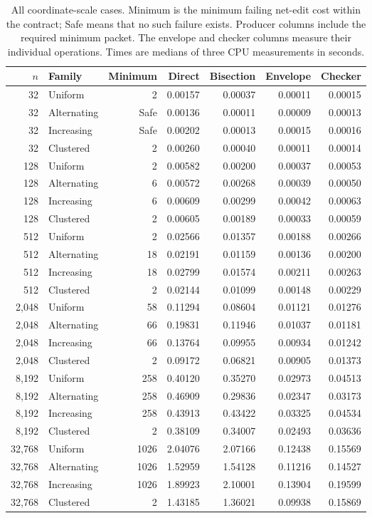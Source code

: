 \begin{table}[t]
\caption{All coordinate-scale cases. Minimum is the minimum failing net-edit cost within the contract; Safe means that no such failure exists. Producer columns include the required minimum packet. The envelope and checker columns measure their individual operations. Times are medians of three CPU measurements in seconds.}
\label{tab:scaling}
\begin{tabular}{rlrrrrr}
\toprule
$n$ & Family & Minimum & Direct & Bisection & Envelope & Checker\\
\midrule
32 & Uniform & 2 & 0.00157 & 0.00037 & 0.00011 & 0.00015 \\
32 & Alternating & Safe & 0.00136 & 0.00011 & 0.00009 & 0.00013 \\
32 & Increasing & Safe & 0.00202 & 0.00013 & 0.00015 & 0.00016 \\
32 & Clustered & 2 & 0.00260 & 0.00040 & 0.00011 & 0.00014 \\
128 & Uniform & 2 & 0.00582 & 0.00200 & 0.00037 & 0.00053 \\
128 & Alternating & 6 & 0.00572 & 0.00268 & 0.00039 & 0.00050 \\
128 & Increasing & 6 & 0.00609 & 0.00299 & 0.00042 & 0.00063 \\
128 & Clustered & 2 & 0.00605 & 0.00189 & 0.00033 & 0.00059 \\
512 & Uniform & 2 & 0.02566 & 0.01357 & 0.00188 & 0.00266 \\
512 & Alternating & 18 & 0.02191 & 0.01159 & 0.00136 & 0.00200 \\
512 & Increasing & 18 & 0.02799 & 0.01574 & 0.00211 & 0.00263 \\
512 & Clustered & 2 & 0.02144 & 0.01099 & 0.00148 & 0.00229 \\
2,048 & Uniform & 58 & 0.11294 & 0.08604 & 0.01121 & 0.01276 \\
2,048 & Alternating & 66 & 0.19831 & 0.11946 & 0.01037 & 0.01181 \\
2,048 & Increasing & 66 & 0.13764 & 0.09955 & 0.00934 & 0.01242 \\
2,048 & Clustered & 2 & 0.09172 & 0.06821 & 0.00905 & 0.01373 \\
8,192 & Uniform & 258 & 0.40120 & 0.35270 & 0.02973 & 0.04513 \\
8,192 & Alternating & 258 & 0.46909 & 0.29836 & 0.02347 & 0.03173 \\
8,192 & Increasing & 258 & 0.43913 & 0.43422 & 0.03325 & 0.04534 \\
8,192 & Clustered & 2 & 0.38109 & 0.34007 & 0.02493 & 0.03636 \\
32,768 & Uniform & 1026 & 2.04076 & 2.07166 & 0.12438 & 0.15569 \\
32,768 & Alternating & 1026 & 1.52959 & 1.54128 & 0.11216 & 0.14527 \\
32,768 & Increasing & 1026 & 1.89923 & 2.10001 & 0.13904 & 0.19599 \\
32,768 & Clustered & 2 & 1.43185 & 1.36021 & 0.09938 & 0.15869 \\
\bottomrule
\end{tabular}
\end{table}

